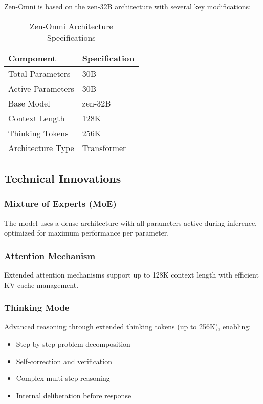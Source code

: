 \documentclass[11pt,a4paper]{article}
\begin{document}
Zen-Omni is based on the zen-32B architecture with several key modifications:

\begin{table}[H]
\centering
\begin{tabular}{ll}
\toprule
\textbf{Component} & \textbf{Specification} \\
\midrule
Total Parameters & 30B \\
Active Parameters & 30B \\
Base Model & zen-32B \\
Context Length & 128K \\
Thinking Tokens & 256K \\


Architecture Type & Transformer \\
\bottomrule
\end{tabular}
\caption{Zen-Omni Architecture Specifications}
\end{table}

\subsection{Technical Innovations}

\subsubsection{Mixture of Experts (MoE)}
The model uses a dense architecture with all parameters active during inference, optimized for maximum performance per parameter.

\subsubsection{Attention Mechanism}
Extended attention mechanisms support up to 128K context length with efficient KV-cache management.

\subsubsection{Thinking Mode}
Advanced reasoning through extended thinking tokens (up to 256K), enabling:
\begin{itemize}
    \item Step-by-step problem decomposition
    \item Self-correction and verification
    \item Complex multi-step reasoning
    \item Internal deliberation before response
\end{itemize}
\end{document}
